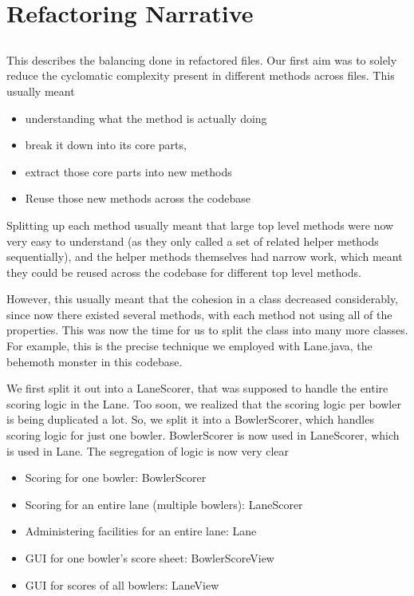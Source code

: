 \section{Refactoring Narrative}

\subsection{}

This describes the balancing done in refactored files. Our first aim was to solely reduce the cyclomatic complexity present in different methods across files. This usually meant

\begin{itemize}
    \item understanding what the method is actually doing
    \item break it down into its core parts,
    \item extract those core parts into new methods
    \item Reuse those new methods across the codebase
\end{itemize}

Splitting up each method usually meant that large top level methods were now very easy to understand (as they only called a set of related helper methods sequentially), and the helper methods themselves had narrow work, which meant they could be reused across the codebase for different top level methods.

However, this usually meant that the cohesion in a class decreased considerably, since now there existed several methods, with each method not using all of the properties. This was now the time for us to split the class into many more classes. For example, this is the precise technique we employed with Lane.java, the behemoth monster in this codebase.

We first split it out into a LaneScorer, that was supposed to handle the entire scoring logic in the Lane. Too soon, we realized that the scoring logic per bowler is being duplicated a lot. So, we split it into a BowlerScorer, which handles scoring logic for just one bowler. BowlerScorer is now used in LaneScorer, which is used in Lane. The segregation of logic is now very clear

\begin{itemize}
    \item Scoring for one bowler: BowlerScorer
    \item Scoring for an entire lane (multiple bowlers): LaneScorer
    \item Administering facilities for an entire lane: Lane
    \item GUI for one bowler's score sheet: BowlerScoreView
    \item GUI for scores of all bowlers: LaneView
\end{itemize}

